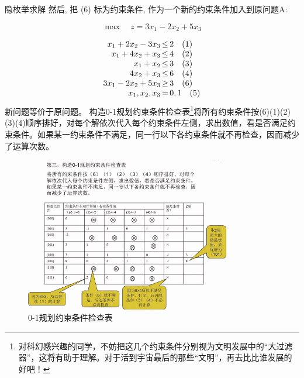 \begin{exbox}{隐枚举求解}
        然后, 把 (6) 标为约束条件, 作为一个新的约束条件加入到原问题A:

        \[
        \max \quad z = 3x_1 - 2x_2 + 5x_3
        \]

        \[
        \begin{array}{r@{\,}c@{\,}l}
        x_1 + 2x_2 - 3x_3 & \leq & 2 \quad (1) \\
        x_1 + 4x_2 + x_3 & \leq & 4 \quad (2) \\
        x_1 + x_2 & \leq & 3 \quad (3) \\
        4x_2 + x_3 & \leq & 6 \quad (4) \\
        3x_1 - 2x_2 + 5x_3 & \geq & 3 \quad (6) \\
        x_1, x_2, x_3 & = & 0, 1 \quad (5)
        \end{array}
        \]
        新问题等价于原问题。
        构造0-1规划约束条件检查表\footnote{对科幻感兴趣的同学，不妨把这几个约束条件分别视为文明发展中的“大过滤器”，这将有助于理解。对于活到宇宙最后的那些“文明”，再去比比谁发展的好吧！ }将所有约束条件按(6)(1)(2)(3)(4)顺序排好，对每个解依次代入每个约束条件左侧，求出数值，看是否满足约束条件。如果某一约束条件不满足，同一行以下各约束条件就不再检查，因而减少了运算次数。
        \begin{figure}[H]
            \centering
            \includegraphics[width=0.8\textwidth]{./image/16.png}
            \caption{0-1规划约束条件检查表}
            \label{fig:Chapter4_Temporary_Pavilion_1}
        \end{figure}
    \end{exbox}







